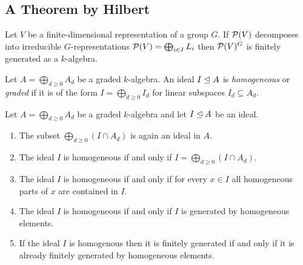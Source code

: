 \subsection{A Theorem by Hilbert}


\begin{theorem}[Hilbert]
  Let $V$ be a finite-dimensional representation of a group $G$.
  If $\mathcal{P}(V)$ decomposes into irreducible $G$-representations $\mathcal{P}(V) = \bigoplus_{i \in I} L_i$ then $\mathcal{P}(V)^G$ is finitely generated as a $k$-algebra.
\end{theorem}


\begin{definition}
  Let $A = \bigoplus_{d \geq 0} A_d$ be a graded $k$-algebra.
  An ideal $I \trianglelefteq A$ is \emph{homogeneous} or \emph{graded} if it is of the form $I = \bigoplus_{d \geq 0} I_d$ for linear subspaces $I_d \subseteq A_d$.
\end{definition}


\begin{lemma}
  \label{lemma: characterization of homogeneous ideals via homogeneous generators}
  Let $A = \bigoplus_{d \geq 0} A_d$ be a graded $k$-algebra and let $I \trianglelefteq A$ be an ideal.
  \begin{enumerate}
    \item
      The subset $\bigoplus_{d \geq 0} (I \cap A_d)$ is again an ideal in $A$.
    \item
      The ideal $I$ is homogeneous if and only if $I = \bigoplus_{d \geq 0} (I \cap A_d)$.
    \item
      The ideal $I$ is homogeneous if and only if for every $x \in I$ all homogeneous parts of $x$ are contained in $I$.
    \item
      The ideal $I$ is homogeneous if and only if $I$ is generated by homogeneous elements.
    \item
      If the ideal $I$ is homogenous then it is finitely generated if and only if it is already finitely generated by homogeneous elements.
  \end{enumerate}
\end{lemma}


